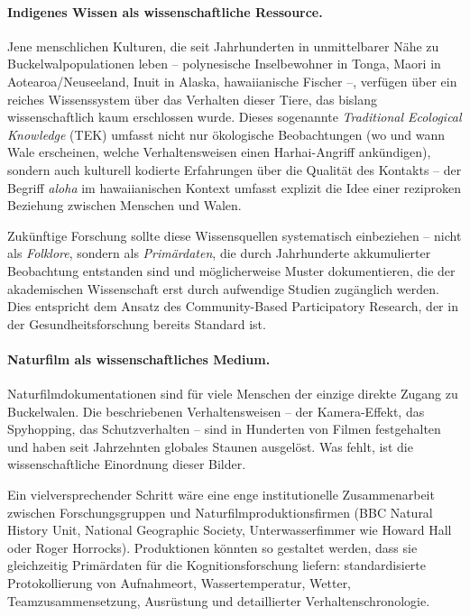 ﻿\documentclass[12pt,a4paper]{article}
\theoremstyle{definition}
\theoremstyle{remark}
\begin{document}
\paragraph{Indigenes Wissen als wissenschaftliche Ressource.}
Jene menschlichen Kulturen, die seit Jahrhunderten in unmittelbarer Nähe zu Buckelwalpopulationen leben -- polynesische Inselbewohner in Tonga, Maori in Aotearoa/Neuseeland, Inuit in Alaska, hawaiianische Fischer --, verfügen über ein reiches Wissenssystem über das Verhalten dieser Tiere, das bislang wissenschaftlich kaum erschlossen wurde. Dieses sogenannte \emph{Traditional Ecological Knowledge} (TEK) umfasst nicht nur ökologische Beobachtungen (wo und wann Wale erscheinen, welche Verhaltensweisen einen Harhai-Angriff ankündigen), sondern auch kulturell kodierte Erfahrungen über die Qualität des Kontakts -- der Begriff \emph{aloha} im hawaiianischen Kontext umfasst explizit die Idee einer reziproken Beziehung zwischen Menschen und Walen.

Zukünftige Forschung sollte diese Wissensquellen systematisch einbeziehen -- nicht als \emph{Folklore}, sondern als \emph{Primärdaten}, die durch Jahrhunderte akkumulierter Beobachtung entstanden sind und möglicherweise Muster dokumentieren, die der akademischen Wissenschaft erst durch aufwendige Studien zugänglich werden. Dies entspricht dem Ansatz des Community-Based Participatory Research, der in der Gesundheitsforschung bereits Standard ist.

\paragraph{Naturfilm als wissenschaftliches Medium.}
Naturfilmdokumentationen sind für viele Menschen der einzige direkte Zugang zu Buckelwalen. Die beschriebenen Verhaltensweisen -- der Kamera-Effekt, das Spyhopping, das Schutzverhalten -- sind in Hunderten von Filmen festgehalten und haben seit Jahrzehnten globales Staunen ausgelöst. Was fehlt, ist die wissenschaftliche Einordnung dieser Bilder.

Ein vielversprechender Schritt wäre eine enge institutionelle Zusammenarbeit zwischen Forschungsgruppen und Naturfilmproduktionsfirmen (BBC Natural History Unit, National Geographic Society, Unterwasserfimmer wie Howard Hall oder Roger Horrocks). Produktionen könnten so gestaltet werden, dass sie gleichzeitig Primärdaten für die Kognitionsforschung liefern: standardisierte Protokollierung von Aufnahmeort, Wassertemperatur, Wetter, Teamzusammensetzung, Ausrüstung und detaillierter Verhaltenschronologie.
\end{document}
